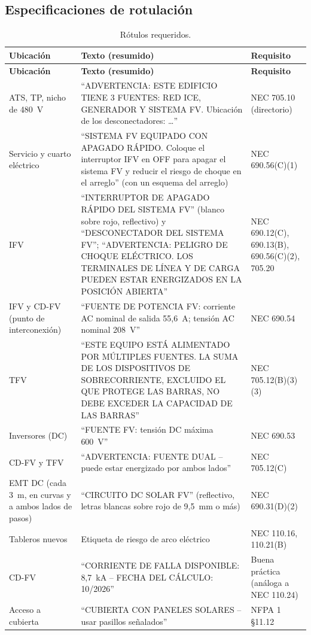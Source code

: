 \documentclass[12pt]{article}
\begin{document}
\subsection{Especificaciones de rotulación}
{\small
\begin{longtable}{L{3.0cm}L{6.6cm}L{5.3cm}}
\caption{Rótulos requeridos.}\label{tab:rotulos}\\
\toprule
\textbf{Ubicación} & \textbf{Texto (resumido)} & \textbf{Requisito}\\
\midrule\endfirsthead
\toprule
\textbf{Ubicación} & \textbf{Texto (resumido)} & \textbf{Requisito}\\
\midrule\endhead
ATS, TP, nicho de 480~V & ``ADVERTENCIA: ESTE EDIFICIO TIENE 3 FUENTES: RED ICE, GENERADOR Y SISTEMA FV. Ubicación de los desconectadores: \ldots'' & NEC 705.10 (directorio)\\
Servicio y cuarto eléctrico & ``SISTEMA FV EQUIPADO CON APAGADO RÁPIDO. Coloque el interruptor IFV en OFF para apagar el sistema FV y reducir el riesgo de choque en el arreglo'' (con un esquema del arreglo) & NEC 690.56(C)(1)\\
IFV & ``INTERRUPTOR DE APAGADO RÁPIDO DEL SISTEMA FV'' (blanco sobre rojo, reflectivo) y ``DESCONECTADOR DEL SISTEMA FV''; ``ADVERTENCIA: PELIGRO DE CHOQUE ELÉCTRICO. LOS TERMINALES DE LÍNEA Y DE CARGA PUEDEN ESTAR ENERGIZADOS EN LA POSICIÓN ABIERTA'' & NEC 690.12(C), 690.13(B), 690.56(C)(2), 705.20\\
IFV y CD-FV (punto de interconexión) & ``FUENTE DE POTENCIA FV: corriente AC nominal de salida 55,6~A; tensión AC nominal 208~V'' & NEC 690.54\\
TFV & ``ESTE EQUIPO ESTÁ ALIMENTADO POR MÚLTIPLES FUENTES. LA SUMA DE LOS DISPOSITIVOS DE SOBRECORRIENTE, EXCLUIDO EL QUE PROTEGE LAS BARRAS, NO DEBE EXCEDER LA CAPACIDAD DE LAS BARRAS'' & NEC 705.12(B)(3)(3)\\
Inversores (DC) & ``FUENTE FV: tensión DC máxima 600~V'' & NEC 690.53\\
CD-FV y TFV & ``ADVERTENCIA: FUENTE DUAL -- puede estar energizado por ambos lados'' & NEC 705.12(C)\\
EMT DC (cada 3~m, en curvas y a ambos lados de pasos) & ``CIRCUITO DC SOLAR FV'' (reflectivo, letras blancas sobre rojo de 9,5~mm o más) & NEC 690.31(D)(2)\\
Tableros nuevos & Etiqueta de riesgo de arco eléctrico & NEC 110.16, 110.21(B)\\
CD-FV & ``CORRIENTE DE FALLA DISPONIBLE: 8,7~kA -- FECHA DEL CÁLCULO: 10/2026'' & Buena práctica (análoga a NEC 110.24)\\
Acceso a cubierta & ``CUBIERTA CON PANELES SOLARES -- usar pasillos señalados'' & NFPA 1 §11.12\\
\bottomrule
\end{longtable}}
\end{document}
